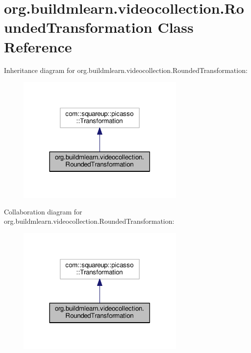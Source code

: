 \hypertarget{classorg_1_1buildmlearn_1_1videocollection_1_1RoundedTransformation}{}\section{org.\+buildmlearn.\+videocollection.\+Rounded\+Transformation Class Reference}
\label{classorg_1_1buildmlearn_1_1videocollection_1_1RoundedTransformation}


Inheritance diagram for org.\+buildmlearn.\+videocollection.\+Rounded\+Transformation\+:
\nopagebreak
\begin{figure}[H]
\begin{center}
\leavevmode
\includegraphics[width=233pt]{classorg_1_1buildmlearn_1_1videocollection_1_1RoundedTransformation__inherit__graph}
\end{center}
\end{figure}


Collaboration diagram for org.\+buildmlearn.\+videocollection.\+Rounded\+Transformation\+:
\nopagebreak
\begin{figure}[H]
\begin{center}
\leavevmode
\includegraphics[width=233pt]{classorg_1_1buildmlearn_1_1videocollection_1_1RoundedTransformation__coll__graph}
\end{center}
\end{figure}
